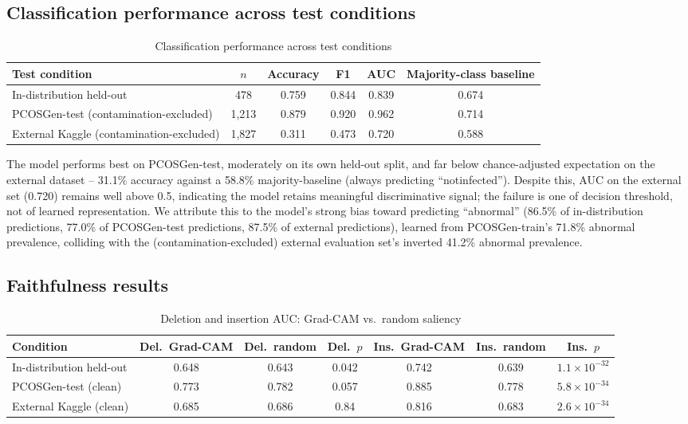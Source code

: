 \documentclass[conference]{IEEEtran}
\begin{document}
\subsection{Classification performance across test conditions}

\begin{table}[t]
\centering
\caption{Classification performance across test conditions}
\label{tab:classification}
\begin{tabular}{@{}lccccc@{}}
\toprule
Test condition & $n$ & Accuracy & F1 & AUC & Majority-class baseline \\
\midrule
In-distribution held-out & 478 & 0.759 & 0.844 & 0.839 & 0.674 \\
PCOSGen-test (contamination-excluded) & 1,213 & 0.879 & 0.920 & 0.962 & 0.714 \\
External Kaggle (contamination-excluded) & 1,827 & 0.311 & 0.473 & 0.720 & 0.588 \\
\bottomrule
\end{tabular}
\end{table}

The model performs best on PCOSGen-test, moderately on its own held-out split, and far below chance-adjusted expectation on the external dataset -- 31.1\% accuracy against a 58.8\% majority-baseline (always predicting ``notinfected''). Despite this, AUC on the external set (0.720) remains well above 0.5, indicating the model retains meaningful discriminative signal; the failure is one of decision threshold, not of learned representation. We attribute this to the model's strong bias toward predicting ``abnormal'' (86.5\% of in-distribution predictions, 77.0\% of PCOSGen-test predictions, 87.5\% of external predictions), learned from PCOSGen-train's 71.8\% abnormal prevalence, colliding with the (contamination-excluded) external evaluation set's inverted 41.2\% abnormal prevalence.

\subsection{Faithfulness results}

\begin{table}[t]
\centering
\caption{Deletion and insertion AUC: Grad-CAM vs.\ random saliency}
\label{tab:faithfulness}
\begin{tabular}{@{}lcccccc@{}}
\toprule
Condition & Del.\ Grad-CAM & Del.\ random & Del.\ $p$ & Ins.\ Grad-CAM & Ins.\ random & Ins.\ $p$ \\
\midrule
In-distribution held-out & 0.648 & 0.643 & 0.042 & 0.742 & 0.639 & $1.1\times10^{-32}$ \\
PCOSGen-test (clean) & 0.773 & 0.782 & 0.057 & 0.885 & 0.778 & $5.8\times10^{-34}$ \\
External Kaggle (clean) & 0.685 & 0.686 & 0.84 & 0.816 & 0.683 & $2.6\times10^{-34}$ \\
\bottomrule
\end{tabular}
\end{table}
\end{document}
